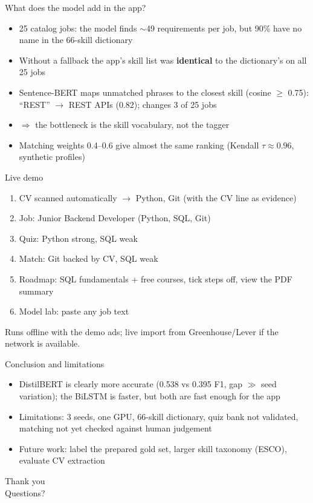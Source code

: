 \documentclass[aspectratio=169,11pt]{beamer}
\begin{document}
\begin{frame}{What does the model add in the app?}
\begin{itemize}
  \item 25 catalog jobs: the model finds $\sim$49 requirements per job, but 90\% have no name in the
        66-skill dictionary
  \item Without a fallback the app's skill list was \textbf{identical} to the dictionary's on all 25 jobs
  \item Sentence-BERT maps unmatched phrases to the closest skill (cosine $\ge$ 0.75):
        ``REST'' $\rightarrow$ REST APIs (0.82); changes 3 of 25 jobs
  \item $\Rightarrow$ the bottleneck is the skill vocabulary, not the tagger
  \item Matching weights 0.4--0.6 give almost the same ranking (Kendall $\tau \approx 0.96$, synthetic
        profiles)
\end{itemize}
\end{frame}

\begin{frame}{Live demo}
\begin{enumerate}
  \item CV scanned automatically $\rightarrow$ Python, Git (with the CV line as evidence)
  \item Job: Junior Backend Developer (Python, SQL, Git)
  \item Quiz: Python strong, SQL weak
  \item Match: Git backed by CV, SQL weak
  \item Roadmap: SQL fundamentals + free courses, tick steps off, view the PDF summary
  \item Model lab: paste any job text
\end{enumerate}
\small Runs offline with the demo ads; live import from Greenhouse/Lever if the network is available.
\end{frame}

\begin{frame}{Conclusion and limitations}
\begin{itemize}
  \item DistilBERT is clearly more accurate (0.538 vs 0.395 F1, gap $\gg$ seed variation); the BiLSTM
        is faster, but both are fast enough for the app
  \item Limitations: 3 seeds, one GPU, 66-skill dictionary, quiz bank not validated, matching not yet
        checked against human judgement
  \item Future work: label the prepared gold set, larger skill taxonomy (ESCO), evaluate CV extraction
\end{itemize}
\end{frame}

\begin{frame}
\centering \Large Thank you \\[1em] \normalsize Questions?
\end{frame}
\end{document}

